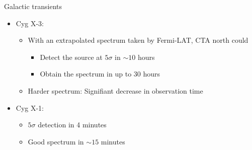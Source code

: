 \begin{frame}{Galactic transients}
  \begin{itemize}
    \item [] Cyg X-3:
    \begin{itemize}
      \item With an extrapolated spectrum taken by Fermi-LAT, CTA north could
      \begin{itemize}
        \item [\to] Detect the source at $5\sigma$ in $\sim\num{10}$ hours
        \item [\to] Obtain the spectrum in up to $\num{30}$ hours
      \end{itemize}
      \item Harder spectrum: Signifiant decrease in observation time
    \end{itemize}
    \item [] Cyg X-1:
      \begin{itemize}
        \item [\to] $5\sigma$ detection in 4 minutes
        \item [\to] Good spectrum in $\sim\num{15}$ minutes
      \end{itemize}
  \end{itemize}
  \begin{overprint}
    \begin{minipage}{0.48\textwidth}
      \centering
\end{minipage}
\end{overprint}
\end{frame}
